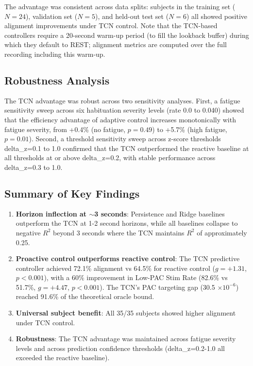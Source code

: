 \documentclass[11pt,letterpaper]{article}
\begin{document}
The advantage was consistent across data splits: subjects in the training set ($N = 24$), validation set ($N = 5$), and held-out test set ($N = 6$) all showed positive alignment improvements under TCN control. Note that the TCN-based controllers require a 20-second warm-up period (to fill the lookback buffer) during which they default to REST; alignment metrics are computed over the full recording including this warm-up.

\subsection{Robustness Analysis}

The TCN advantage was robust across two sensitivity analyses. First, a fatigue sensitivity sweep across six habituation severity levels (rate 0.0 to 0.040) showed that the efficiency advantage of adaptive control increases monotonically with fatigue severity, from +0.4\% (no fatigue, $p=0.49$) to +5.7\% (high fatigue, $p=0.01$). Second, a threshold sensitivity sweep across z-score thresholds delta\_z=0.1 to 1.0 confirmed that the TCN outperformed the reactive baseline at all thresholds at or above delta\_z=0.2, with stable performance across delta\_z=0.3 to 1.0.

\subsection{Summary of Key Findings}

\begin{enumerate}[nosep]
  \item \textbf{Horizon inflection at $\sim$3 seconds}: Persistence and Ridge baselines outperform the TCN at 1-2 second horizons, while all baselines collapse to negative $R^2$ beyond 3 seconds where the TCN maintains $R^2$ of approximately 0.25.
  \item \textbf{Proactive control outperforms reactive control}: The TCN predictive controller achieved 72.1\% alignment vs 64.5\% for reactive control ($g = +1.31$, $p < 0.001$), with a 60\% improvement in Low-PAC Stim Rate (82.6\% vs 51.7\%, $g = +4.47$, $p < 0.001$). The TCN's PAC targeting gap (30.5 $\times 10^{-6}$) reached 91.6\% of the theoretical oracle bound.
  \item \textbf{Universal subject benefit}: All 35/35 subjects showed higher alignment under TCN control.
  \item \textbf{Robustness}: The TCN advantage was maintained across fatigue severity levels and across prediction confidence thresholds (delta\_z=0.2-1.0 all exceeded the reactive baseline).
\end{enumerate}
\end{document}

